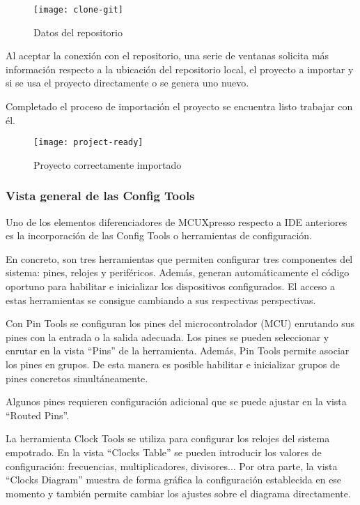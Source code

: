 \begin{figure}[!h]
  \centering
  \texttt{[image: clone-git]}
  \caption{Datos del repositorio} \label{fig:clone-git}
\end{figure}

Al aceptar la conexión con el repositorio, una serie de ventanas solicita más
información respecto a la ubicación del repositorio local, el proyecto a 
importar y si se usa el proyecto directamente o se genera uno nuevo.

Completado el proceso de importación el proyecto se encuentra listo 
trabajar con él.

\begin{figure}[!h]
  \centering
  \texttt{[image: project-ready]}
  \caption{Proyecto correctamente importado} \label{fig:project-ready}
\end{figure}

\subsubsection{Vista general de las Config Tools} \label{sec:config-tools}
Uno de los elementos diferenciadores de MCUXpresso respecto a IDE anteriores
es la incorporación de las Config Tools o herramientas de configuración.

En concreto, son tres herramientas que permiten configurar tres componentes
del sistema: pines, relojes y periféricos. Además, generan automáticamente el
código oportuno para habilitar e inicializar los dispositivos configurados. El
acceso a estas herramientas se consigue cambiando a sus respectivas perspectivas.

Con Pin Tools se configuran los pines del microcontrolador (MCU) enrutando
sus pines con la entrada o la salida adecuada. Los pines se pueden seleccionar y
enrutar en la vista ``Pins'' de la herramienta. Además, Pin Tools permite asociar
los pines en grupos. De esta manera es posible habilitar e inicializar grupos
de pines concretos simultáneamente.


Algunos pines requieren configuración adicional que se puede ajustar en la vista
``Routed Pins''.


La herramienta Clock Tools se utiliza para configurar los relojes del sistema
empotrado. En la vista ``Clocks Table'' se pueden introducir los valores de
configuración: frecuencias, multiplicadores, divisores... Por otra parte, la
vista ``Clocks Diagram'' muestra de forma gráfica la configuración establecida
en ese momento y también permite cambiar los ajustes sobre el diagrama
directamente.

